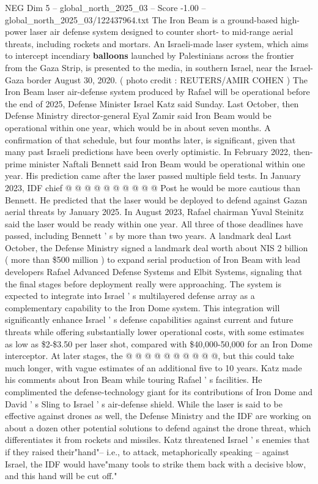 \begin{textsample}{NEG Dim 5 – global\_north\_2025\_03 – Score -1.00 – global\_north\_2025\_03/122437964.txt}  \label{ex:f5_neg_254}
The Iron Beam is a ground-based high-power laser air defense system designed to counter short- to mid-range aerial threats, including rockets and mortars.
An Israeli-made laser system, which aims to intercept incendiary \textbf{balloons} launched by Palestinians across the frontier from the Gaza Strip, is presented to the media, in southern Israel, near the Israel-Gaza border August 30, 2020. ( photo credit : REUTERS/AMIR COHEN ) The Iron Beam laser air-defense system produced by Rafael will be operational before the end of 2025, Defense Minister Israel Katz said Sunday.
Last October, then Defense Ministry director-general Eyal Zamir said Iron Beam would be operational within one year, which would be in about seven months.
A confirmation of that schedule, but four months later, is significant, given that many past Israeli predictions have been overly optimistic.
In February 2022, then-prime minister Naftali Bennett said Iron Beam would be operational within one year.
His prediction came after the laser passed multiple field tests.
In January 2023, IDF chief @ @ @ @ @ @ @ @ @ @ Post he would be more cautious than Bennett.
He predicted that the laser would be deployed to defend against Gazan aerial threats by January 2025.
In August 2023, Rafael chairman Yuval Steinitz said the laser would be ready within one year.
All three of those deadlines have passed, including Bennett ' s by more than two years.
A landmark deal Last October, the Defense Ministry signed a landmark deal worth about NIS 2 billion ( more than \$500 million ) to expand serial production of Iron Beam with lead developers Rafael Advanced Defense Systems and Elbit Systems, signaling that the final stages before deployment really were approaching.
The system is expected to integrate into Israel ' s multilayered defense array as a complementary capability to the Iron Dome system.
This integration will significantly enhance Israel ' s defense capabilities against current and future threats while offering substantially lower operational costs, with some estimates as low as \$2-\$3.50 per laser shot, compared with \$40,000-50,000 for an Iron Dome interceptor.
At later stages, the @ @ @ @ @ @ @ @ @ @, but this could take much longer, with vague estimates of an additional five to 10 years.
Katz made his comments about Iron Beam while touring Rafael ' s facilities.
He complimented the defense-technology giant for its contributions of Iron Dome and David ' s Sling to Israel ' s air-defense shield.
While the laser is said to be effective against drones as well, the Defense Ministry and the IDF are working on about a dozen other potential solutions to defend against the drone threat, which differentiates it from rockets and missiles.
Katz threatened Israel ' s enemies that if they raised their"hand"-- i.e., to attack, metaphorically speaking -- against Israel, the IDF would have"many tools to strike them back with a decisive blow, and this hand will be cut off."

\end{textsample}
